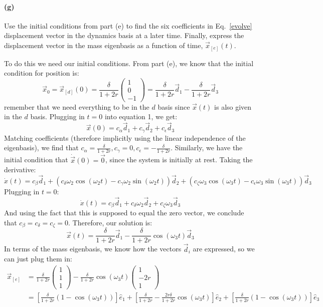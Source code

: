 \documentclass{article}
\begin{document}
\paragraph{(g)}
Use the initial conditions from part (e) to find the six coefficients in Eq.~\ref{evolve} displacement vector in the dynamics basis at a later time.  Finally, express the 
displacement vector in the mass eigenbasis as a function of time, $\vec{x}_{[e]}(t)$.

\begin{solution}
	To do this we need our initial conditions. From part (e), we know that the initial condition for position is:
	\[
		\vec x_0 = \vec x_{[d]}(0) = \frac{\delta}{1 + 2r}\begin{pmatrix} 1 \\0 \\ -1 \end{pmatrix} = 
		\frac{\delta}{1 + 2r}\vec d_1 - \frac{\delta}{1 + 2r}\vec d_3
	\] 
	remember that we need everything to be in the $d$ basis since $\vec x(t)$ is also given in the $d$ basis. 
	Plugging in $t = 0$ into equation 1, we get:
	\[
	\vec x(0) = c_\alpha \vec d_1 + c_\gamma \vec d_2 + c_\epsilon \vec d_3 
	\] 
	Matching coefficients (therefore implicitly using the linear independence of the eigenbasis), we find that 
	$c_\alpha = \frac{\delta}{1 + 2r}, c_\gamma = 0, 
	c_\epsilon = -\frac{\delta}{1 + 2r}$. Similarly, we have the initial condition that $\dot{\vec x}(0) = 
	\vec 0$, since the system is initially at rest. Taking the derivative:
	\[
		\dot{x}(t) = c_\beta \vec d_1 + (c_\delta \omega_2 \cos(\omega_2 t) - c_\gamma \omega_2\sin(\omega_2t))
		\vec d_2 + (c_\zeta\omega_3\cos(\omega_3t) - c_\epsilon \omega_3 \sin(\omega_3t))\vec d_3
	\] 
	Plugging in $t = 0$:
	\[
	\dot x(t) = c_\beta \vec d_1 + c_\delta\omega_2 \vec d_2 + c_\zeta \omega_3 \vec d_3 
	\] 
	And using the fact that this is supposed to equal the zero vector, we conclude that $c_\beta = c_\delta =
	c_\zeta = 0$. Therefore, our solution is:
	\[
	\vec x(t) = \frac{\delta}{1 + 2r}\vec d_1 -\frac{\delta}{1 + 2r}\cos(\omega_3t) \vec d_3
	\] 
	In terms of the mass eigenbasis, we know how the vectors $\vec d_i$ are expressed, so we can just plug 
	them in:
	\begin{align*}
		\vec x_{[e]} &= \frac{\delta}{1 + 2r}\begin{pmatrix} 1\\1\\1 \end{pmatrix} - 
		\frac{\delta}{1 + 2r}\cos(\omega_3t) \begin{pmatrix} 1 \\-2r\\1 \end{pmatrix} \\
					 &= \left[\frac{\delta}{1 + 2r}(1 - \cos(\omega_3t))\right]\hat{e}_1 + \left[\frac{\delta}{1 + 2r} - \frac{2r \delta}{1 + 2r}\cos(\omega_3t)\right]\hat{e}_2 + \left[\frac{\delta}{1 + 2r}(1 - \cos(\omega_3t))\right]\hat{e}_3
	\end{align*}
\end{solution}
\end{document}
